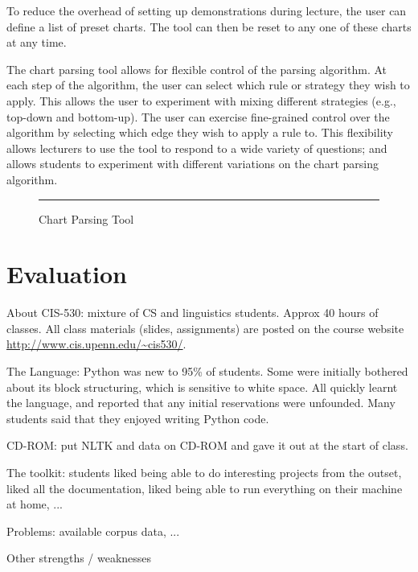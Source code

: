 \documentclass[11pt]{article}
\begin{document}
To reduce the overhead of setting up demonstrations during lecture,
the user can define a list of preset charts.  The tool can then be
reset to any one of these charts at any time.

The chart parsing tool allows for flexible control of the parsing
algorithm.  At each step of the algorithm, the user can select which
rule or strategy they wish to apply.  This allows the user to
experiment with mixing different strategies (e.g., top-down and
bottom-up).  The user can exercise fine-grained control over the
algorithm by selecting which edge they wish to apply a rule to.  This
flexibility allows lecturers to use the tool to respond to a wide
variety of questions; and allows students to experiment with different
variations on the chart parsing algorithm.

\begin{figure}
\centerline{}
\caption{Chart Parsing Tool}\label{fig:chartparse}
\vspace*{2ex}\hrule
\end{figure}

\section{Evaluation}
\label{sec:evaluation}

About CIS-530: mixture of CS and linguistics students.
Approx 40 hours of classes.  All class materials (slides,
assignments) are posted on the course website
\url{http://www.cis.upenn.edu/~cis530/}.

The Language: Python was new to 95\% of students.  Some were initially
bothered about its block structuring, which is sensitive to white
space.  All quickly learnt the language, and reported that any initial
reservations were unfounded.  Many students said that they enjoyed
writing Python code.

CD-ROM: put NLTK and data on CD-ROM and gave it out at the start of class.

The toolkit: students liked being able to do interesting projects from
the outset, liked all the documentation, liked being able to run
everything on their machine at home, ...

Problems: available corpus data, ...

Other strengths / weaknesses

\end{document}
